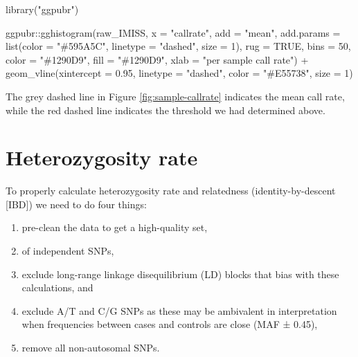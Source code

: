 \documentclass[
]{book}
\newenvironment{Shaded}{\begin{snugshade}}{\end{snugshade}}
\newcommand{\AttributeTok}[1]{\textcolor[rgb]{0.77,0.63,0.00}{#1}}
\newcommand{\ConstantTok}[1]{\textcolor[rgb]{0.00,0.00,0.00}{#1}}
\newcommand{\DecValTok}[1]{\textcolor[rgb]{0.00,0.00,0.81}{#1}}
\newcommand{\FloatTok}[1]{\textcolor[rgb]{0.00,0.00,0.81}{#1}}
\newcommand{\FunctionTok}[1]{\textcolor[rgb]{0.00,0.00,0.00}{#1}}
\newcommand{\NormalTok}[1]{#1}
\newcommand{\SpecialCharTok}[1]{\textcolor[rgb]{0.00,0.00,0.00}{#1}}
\newcommand{\StringTok}[1]{\textcolor[rgb]{0.31,0.60,0.02}{#1}}
\providecommand{\tightlist}{%
  \setlength{\itemsep}{0pt}\setlength{\parskip}{0pt}}
\begin{document}
\begin{Shaded}
\begin{Highlighting}[]
\FunctionTok{library}\NormalTok{(}\StringTok{"ggpubr"}\NormalTok{)}

\NormalTok{ggpubr}\SpecialCharTok{::}\FunctionTok{gghistogram}\NormalTok{(raw\_IMISS, }\AttributeTok{x =} \StringTok{"callrate"}\NormalTok{,}
                    \AttributeTok{add =} \StringTok{"mean"}\NormalTok{, }\AttributeTok{add.params =} \FunctionTok{list}\NormalTok{(}\AttributeTok{color =} \StringTok{"\#595A5C"}\NormalTok{, }\AttributeTok{linetype =} \StringTok{"dashed"}\NormalTok{, }\AttributeTok{size =} \DecValTok{1}\NormalTok{),}
                    \AttributeTok{rug =} \ConstantTok{TRUE}\NormalTok{, }\AttributeTok{bins =} \DecValTok{50}\NormalTok{,}
                    \AttributeTok{color =} \StringTok{"\#1290D9"}\NormalTok{, }\AttributeTok{fill =} \StringTok{"\#1290D9"}\NormalTok{,}
                    \AttributeTok{xlab =} \StringTok{"per sample call rate"}\NormalTok{) }\SpecialCharTok{+}
  \FunctionTok{geom\_vline}\NormalTok{(}\AttributeTok{xintercept =} \FloatTok{0.95}\NormalTok{, }\AttributeTok{linetype =} \StringTok{"dashed"}\NormalTok{,}
                \AttributeTok{color =} \StringTok{"\#E55738"}\NormalTok{, }\AttributeTok{size =} \DecValTok{1}\NormalTok{)}
\end{Highlighting}
\end{Shaded}

The grey dashed line in Figure \ref{fig:sample-callrate} indicates the mean call rate, while the red dashed line indicates the threshold we had determined above.

\hypertarget{heterozygosity-rate}{%
\section{Heterozygosity rate}\label{heterozygosity-rate}}

To properly calculate heterozygosity rate and relatedness (identity-by-descent {[}IBD{]}) we need to do four things:

\begin{enumerate}
\def\labelenumi{\arabic{enumi})}
\tightlist
\item
  pre-clean the data to get a high-quality set,
\item
  of independent SNPs,
\item
  exclude long-range linkage disequilibrium (LD) blocks that bias with these calculations, and
\item
  exclude A/T and C/G SNPs as these may be ambivalent in interpretation when frequencies between cases and controls are close (MAF ± 0.45),
\item
  remove all non-autosomal SNPs.
\end{enumerate}
\end{document}

